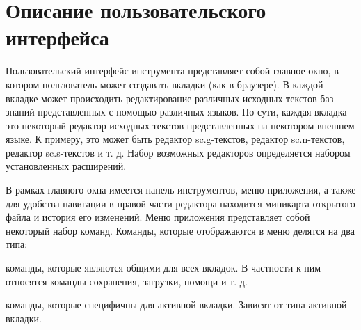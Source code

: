 \newpage
\section{Описание пользовательского интерфейса}

Пользовательский интерфейс инструмента представляет собой главное окно, в котором пользователь может создавать вкладки (как в браузере).
В каждой вкладке может происходить редактирование различных исходных текстов баз знаний представленных с помощью различных языков. 
По сути, каждая вкладка - это некоторый редактор исходных текстов представленных на некотором внешнем языке. К примеру, это может быть 
редактор sc.g-текстов, редактор sc.n-текстов, редактор sc.s-текстов и т. д.
Набор возможных редакторов определяется набором установленных расширений.

В рамках главного окна имеется панель инструментов, меню приложения, а также для удобства навигации в правой части редактора находится миникарта открытого файла и история его изменений. Меню приложения представляет собой некоторый набор команд. 
Команды, которые отображаются в меню делятся на два типа:
\begin{list}{•}{}
	\item команды, которые являются общими для всех вкладок. В частности к ним относятся команды сохранения, загрузки, помощи и т. д.
	\item команды, которые специфичны для активной вкладки. Зависят от типа активной вкладки.
\end{list}

